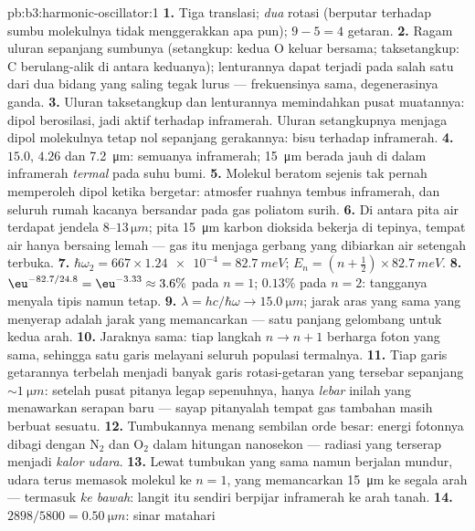 \begin{solution}{pb:b3:harmonic-oscillator:1}
\textbf{1.} Tiga translasi; \emph{dua} rotasi (berputar terhadap sumbu
molekulnya tidak menggerakkan apa pun); $9 - 5 = 4$ getaran.
\textbf{2.} Ragam uluran sepanjang sumbunya (setangkup: kedua O keluar
bersama; taksetangkup: C berulang-alik di antara keduanya); lenturannya
dapat terjadi pada salah satu dari dua bidang yang saling tegak lurus
--- frekuensinya sama, degenerasinya ganda.
\textbf{3.} Uluran taksetangkup dan lenturannya memindahkan pusat
muatannya: dipol berosilasi, jadi aktif terhadap inframerah. Uluran
setangkupnya menjaga dipol molekulnya tetap nol sepanjang gerakannya:
bisu terhadap inframerah.
\textbf{4.} $15.0$, $4.26$ dan \qty{7.2}{\micro m}: semuanya inframerah;
\qty{15}{\micro m} berada jauh di dalam inframerah \emph{termal} pada
suhu bumi.
\textbf{5.} Molekul beratom sejenis tak pernah memperoleh dipol ketika
bergetar: atmosfer ruahnya tembus inframerah, dan seluruh rumah kacanya
bersandar pada gas poliatom surih.
\textbf{6.} Di antara pita air terdapat jendela $8$--$13\,\unit{\micro m}$;
pita \qty{15}{\micro m} karbon dioksida bekerja di tepinya, tempat air
hanya bersaing lemah --- gas itu menjaga gerbang yang dibiarkan air
setengah terbuka.
\textbf{7.} $\hbar\omega_2 = 667 \times \num{1.24e-4} =
\qty{82.7}{meV}$; $E_n = (n + \tfrac12) \times \qty{82.7}{meV}$.
\textbf{8.} $\eu^{-82.7/24.8} = \eu^{-3.33} \approx 3.6\%$ pada $n =
1$; $0.13\%$ pada $n = 2$: tangganya menyala tipis namun tetap.
\textbf{9.} $\lambda = hc/\hbar\omega \to \qty{15.0}{\micro m}$; jarak
aras yang sama yang menyerap adalah jarak yang memancarkan --- satu
panjang gelombang untuk kedua arah.
\textbf{10.} Jaraknya sama: tiap langkah $n \to n + 1$ berharga foton
yang sama, sehingga satu garis melayani seluruh populasi termalnya.
\textbf{11.} Tiap garis getarannya terbelah menjadi banyak garis
rotasi-getaran yang tersebar sepanjang $\sim\qty{1}{\micro m}$: setelah
pusat pitanya legap sepenuhnya, hanya \emph{lebar} inilah yang
menawarkan serapan baru --- sayap pitanyalah tempat gas tambahan masih
berbuat sesuatu.
\textbf{12.} Tumbukannya menang sembilan orde besar: energi fotonnya
dibagi dengan N$_2$ dan O$_2$ dalam hitungan nanosekon --- radiasi yang
terserap menjadi \emph{kalor udara}.
\textbf{13.} Lewat tumbukan yang sama namun berjalan mundur, udara terus
memasok molekul ke $n = 1$, yang memancarkan \qty{15}{\micro m} ke
segala arah --- termasuk \emph{ke bawah}: langit itu sendiri berpijar
inframerah ke arah tanah.
\textbf{14.} $2898/5800 = \qty{0.50}{\micro m}$: sinar matahari

\end{solution}
